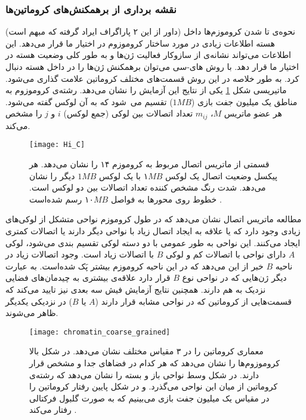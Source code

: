 \subsubsection{نقشه برداری از برهمکنش‌های کروماتین‌ها}
(داور از این ۲ پاراگراف ایراد گرفته که مبهم است) نحوه‌ی تا شدن کروموزم‌ها داخل هسته اطلاعات زیادی در مورد ساختار کروموزوم در اختیار ما قرار می‌دهد. این اطلاعات می‌تواند نشانه‌ی از سازوکار فعالیت ژن‌ها و به طور کلی وضعیت هسته در اختیار ما قرار دهد. با روش های-سی \cite{Lieberman-Aiden289} می‌توان برهمکنش ژن‌ها را در داخل هسته دنبال کرد. به طور خلاصه در این روش قسمت‌های مختلف کروماتین  علامت گذاری می‌شود.  ماتیریسی شکل \ref{fig:Hi-C} یکی از نتایج این آزمایش را نشان می‌دهد. رشته‌ی کروموزوم به مناطق یک میلیون جفت بازی ($1MB$)  تقسیم می شود که به آن لوکس گفته می‌شود. هر عضو ماتریس $M$، $m_{ij}$  تعداد اتصالات بین لوکی (جمع لوکس) $i$ و $j$ را مشخص می‌کند.
\begin{figure}[htbp]
\begin{center}
\texttt{[image: Hi\_C]}
\caption{
  قسمتی از ماتریس اتصال مربوط به کروموزم ۱۴ را نشان می‌دهد. هر پیکسل وضعیت اتصال یک لوکس $۱MB$ با یک لوکس $1MB$ دیگر را نشان می‌دهد. شدت رنگ مشخص کننده تعداد اتصالات بین دو لوکس است. خطوط روی محورها به فواصل $۱۰MB$ رسم شده‌است \cite{Lieberman-Aiden289}.
}
\label{fig:Hi-C}
\end{center}
\end{figure}



مطالعه ماتریس اتصال نشان می‌دهد که در طول کروموزم نواحی متشکل از لوکی‌های زیادی وجود دارد که یا علاقه به ایجاد اتصال زیاد با نواحی دیگر دارند یا اتصالات کمتری ایجاد می‌کنند. این نواحی  به طور عمومی‌ با دو دسته لوکی تقسیم بندی می‌شود، لوکی $A$ دارای نواحی با اتصالات کم و لوکی $B$ با اتصالات زیاد است. وجود اتصالات زیاد در ناحیه $B$ خبر از این می‌دهد که در این ناحیه کروموزم بیشتر پَک  شده‌است. به عبارت دیگر ژن‌هایی که در نواحی نوع $B$ قرار دارد علاقه‌ی بیشتری به چیدمان‌های فضایی نزدیک به هم دارند. همچنین نتایج آزمایش‌ فیش سه بعدی نیز تایید می‌کند که قسمت‌هایی از کروماتین که در نواحی مشابه قرار دارند ($A$ یا $B$) در نزدیکی یکدیگر ظاهر می‌شوند. 
\begin{figure}[htbp]
\begin{center}
\texttt{[image: chromatin\_coarse\_grained]}
\caption{
 معماری کروماتین را در ۳ مقیاس مختلف نشان می‌دهد. در شکل بالا کروموزوم‌ها را نشان می‌دهد که هر کدام در فضا‌های جدا و مشخص قرار دارند. در شکل وسط نواحی باز و بسته را نشان می‌دهد که رشته‌ی کروماتین از میان این نواحی می‌گذرد. و در شکل پایین رفتار کروماتین را در مقیاس یک میلیون جفت بازی می‌بینیم که به صورت گلبول فرکتالی رفتار می‌کند \cite{Lieberman-Aiden289}.
}
\label{fig:chromo_coarse}
\end{center}
\end{figure}

